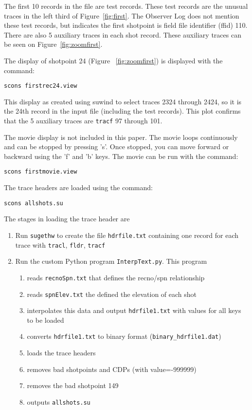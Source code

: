 The first 10 records in the file are test records.  These test
records are the unusual traces in the left third of
Figure~\ref{fig:first}. The Observer Log does not mention these test
records, but indicates the first shotpoint is field file identifier 
(ffid) 110.  There are also 5 auxiliary traces in each shot record.  
These auxiliary traces can be seen on Figure~\ref{fig:zoomfirst}. 

The display of shotpoint 24 (Figure ~\ref{fig:zoomfirst}) is displayed 
with the command: 
\begin{verbatim}
scons firstrec24.view
\end{verbatim}

This display as created using suwind to select traces 2324 through 2424, 
so it is the 24th record in the input file (including the test records). 
This plot confirms that the 5 auxiliary traces are \texttt{tracf} 97 through 101.


The movie display is not included in this paper.  The movie loops 
continuously and can be stopped by pressing 's'.  Once stopped, you 
can move forward or backward using the 'f' and 'b' keys.  The movie can be 
run with the command:
\begin{verbatim}
scons firstmovie.view
\end{verbatim}

The trace headers are loaded using the command:
\begin{verbatim}
scons allshots.su
\end{verbatim}

The stages in loading the trace header are
\begin{enumerate}
\item Run \texttt{sugethw} to create the file \texttt{hdrfile.txt} containing one record for 
each trace with \texttt{tracl}, \texttt{fldr}, \texttt{tracf}
\item Run the custom Python program \texttt{InterpText.py}.  This program
\begin{enumerate}
\item reads \texttt{recnoSpn.txt} that defines the recno/spn relationship
\item reads \texttt{spnElev.txt}  the defined the elevation of each shot
\item interpolates this data and output \texttt{hdrfile1.txt} with values for all keys
to be loaded
\item converts \texttt{hdrfile1.txt} to binary format (\texttt{binary\_hdrfile1.dat})
\item loads the trace headers
\item removes bad shotpoints and CDPs (with value=-999999)
\item removes the bad shotpoint 149
\item outputs \texttt{allshots.su}
\end{enumerate}
\end{enumerate}

